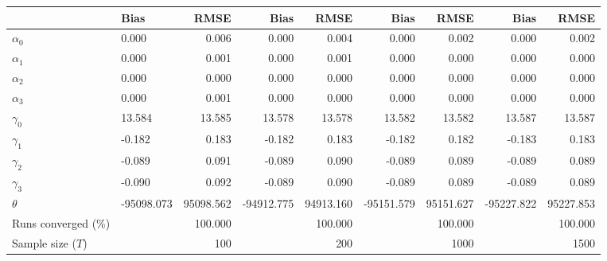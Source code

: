 
\begin{tabular}[t]{llrrrrrrr}
\toprule
  & Bias & RMSE & Bias & RMSE & Bias & RMSE & Bias & RMSE\\
\midrule
$\alpha_{0}$ & 0.000 & 0.006 & 0.000 & 0.004 & 0.000 & 0.002 & 0.000 & 0.002\\
$\alpha_{1}$ & 0.000 & 0.001 & 0.000 & 0.001 & 0.000 & 0.000 & 0.000 & 0.000\\
$\alpha_{2}$ & 0.000 & 0.000 & 0.000 & 0.000 & 0.000 & 0.000 & 0.000 & 0.000\\
$\alpha_{3}$ & 0.000 & 0.001 & 0.000 & 0.000 & 0.000 & 0.000 & 0.000 & 0.000\\
$\gamma_{0}$ & 13.584 & 13.585 & 13.578 & 13.578 & 13.582 & 13.582 & 13.587 & 13.587\\
$\gamma_{1}$ & -0.182 & 0.183 & -0.182 & 0.183 & -0.182 & 0.182 & -0.183 & 0.183\\
$\gamma_{2}$ & -0.089 & 0.091 & -0.089 & 0.090 & -0.089 & 0.089 & -0.089 & 0.089\\
$\gamma_{3}$ & -0.090 & 0.092 & -0.089 & 0.090 & -0.089 & 0.089 & -0.089 & 0.089\\
$\theta$ & -95098.073 & 95098.562 & -94912.775 & 94913.160 & -95151.579 & 95151.627 & -95227.822 & 95227.853\\
Runs converged (\%) &  & 100.000 &  & 100.000 &  & 100.000 &  & 100.000\\
Sample size ($T$) &  & 100 &  & 200 &  & 1000 &  & 1500\\
\bottomrule
\end{tabular}
